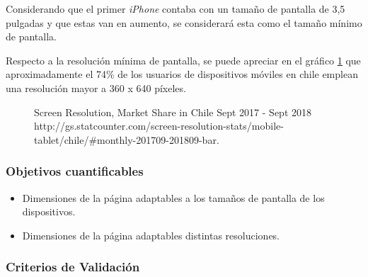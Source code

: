 Considerando que el primer \textit{iPhone} contaba con un tamaño de pantalla de 3,5 pulgadas y que estas van en aumento, se considerará esta como el tamaño mínimo de pantalla.

Respecto a la resolución mínima de pantalla, se puede apreciar en el gráfico \ref{chart:Screen Resolution} que aproximadamente el 74\% de los usuarios de dispositivos móviles en chile emplean una resolución mayor a 360 x 640 píxeles.

\begin{figure}[H]
	\centering
	\caption[Screen Resolution, Market Share in Chile Sept 2017 - Sept 2018.]{Screen Resolution, Market Share in Chile Sept 2017 - Sept 2018 \\ http://gs.statcounter.com/screen-resolution-stats/mobile-tablet/chile/\#monthly-201709-201809-bar.}
	\begin{bchart}[step=10, max=100, width=.8\textwidth, unit=\%]
	\end{bchart}
	\label{chart:Screen Resolution}
\end{figure}

\subsubsection{Objetivos cuantificables}

\begin{itemize}
	\item
	Dimensiones de la página adaptables a los tamaños de pantalla de los dispositivos.
	\item
	Dimensiones de la página adaptables distintas resoluciones.
\end{itemize}

\subsubsection{Criterios de Validación}

